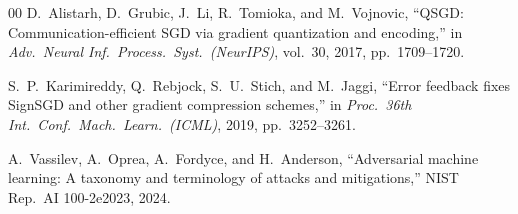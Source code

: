 \documentclass[conference]{IEEEtran}
\begin{document}
\begin{thebibliography}{00}
D.~Alistarh, D.~Grubic, J.~Li, R.~Tomioka, and M.~Vojnovic, ``QSGD: Communication-efficient SGD via gradient quantization and encoding,'' in \emph{Adv.\ Neural Inf.\ Process.\ Syst.\ (NeurIPS)}, vol.~30, 2017, pp.~1709--1720.

S.~P.~Karimireddy, Q.~Rebjock, S.~U.~Stich, and M.~Jaggi, ``Error feedback fixes SignSGD and other gradient compression schemes,'' in \emph{Proc.\ 36th Int.\ Conf.\ Mach.\ Learn.\ (ICML)}, 2019, pp.~3252--3261.

A.~Vassilev, A.~Oprea, A.~Fordyce, and H.~Anderson, ``Adversarial machine learning: A taxonomy and terminology of attacks and mitigations,'' NIST Rep.\ AI 100-2e2023, 2024.

\end{thebibliography}
\end{document}
